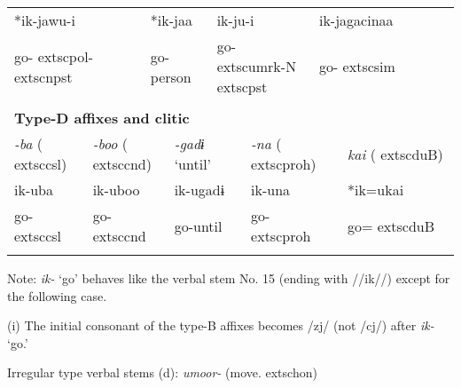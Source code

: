 \begin{tabularx}{\textwidth}{XXXXXXXXXXXXXXXXXXXX}
\multicolumn{3}{X}{{ *ik-jawu-i}} & \multicolumn{4}{X}{*ik-jaa} & \multicolumn{3}{X}{ik-ju-i} & \multicolumn{10}{X}{{ ik-jagacinaa}}\\
\multicolumn{3}{X}{go-	extsc{pol}-	extsc{npst}} & \multicolumn{4}{X}{go-person} & \multicolumn{3}{X}{go-	extsc{umrk}-N	extsc{pst}} & \multicolumn{10}{X}{go-	extsc{sim}}\\
\multicolumn{20}{X}{}\\
\multicolumn{20}{X}{{\bfseries Type-D affixes and clitic}}\\
{ \textit{{}-ba} (	extsc{csl})} & \multicolumn{3}{X}{{ \textit{{}-boo} (	extsc{cnd})}} & \multicolumn{4}{X}{{ \textit{{}-gadɨ} ‘until’}} & \multicolumn{4}{X}{{ \textit{{}-na} (	extsc{proh})}} & \multicolumn{8}{X}{{ \textit{kai} (	extsc{du}B)}}\\
{ ik-uba} & \multicolumn{3}{X}{{ ik-uboo}} & \multicolumn{4}{X}{{ ik-ugadɨ}} & \multicolumn{4}{X}{{ ik-una}} & \multicolumn{8}{X}{{ *ik=ukai}}\\
go-	extsc{csl} & \multicolumn{3}{X}{go-	extsc{cnd}} & \multicolumn{4}{X}{go-until} & \multicolumn{4}{X}{go-	extsc{proh}} & \multicolumn{8}{X}{go=	extsc{du}B}\\
\lspbottomrule
\end{tabularx}
Note: \textit{ik-} ‘go’ behaves like the verbal stem No. 15 (ending with //ik//) except for the following case.

(i)  The initial consonant of the type-B affixes becomes /zj/ (not /cj/) after \textit{ik-} ‘go.’

Irregular type verbal stems (d): \textit{umoor-} (move.	extsc{hon})

\tablefirsthead{}

